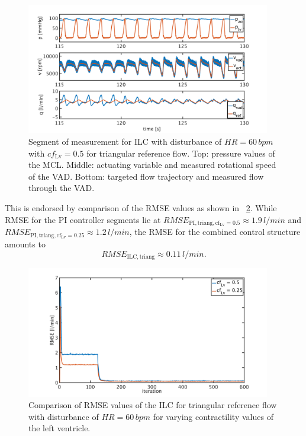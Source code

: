 \begin{figure}[ht!]
  \centering
  \includegraphics[width=0.95\textwidth]{images/chapt_5/ILC/pi_to_ilc_dist_triang_cf50.pdf}
  \caption[]{Segment of measurement for ILC with disturbance of $HR=60\,bpm$ with $cf_{\mathrm{Lv}}=0.5$ for triangular reference flow. Top:  pressure values of the MCL. Middle: actuating variable and measured rotational speed of the VAD. Bottom: targeted flow trajectory and measured flow through the VAD.}
  \label{fig:pi_to_ilc_dist_triang_cf50}
\end{figure}
This is endorsed by comparison of the RMSE values as shown in \figurename~\ref{fig:RMSE_dist_triang_var_cf}. While RMSE for the PI controller segments lie at $RMSE_{\mathrm{PI,triang,cf_{\mathrm{Lv}}=0.5}}\approx 1.9\, l/min$ and $RMSE_{\mathrm{PI,triang,cf_{\mathrm{Lv}}=0.25}}\approx 1.2\, l/min$, the RMSE for the combined control structure amounts to
\begin{equation}
  RMSE_{\mathrm{ILC,triang}}\approx 0.11\, l/min.
\end{equation}
\begin{figure}[ht!]
  \centering
  \includegraphics[width=0.95\textwidth]{images/chapt_5/ILC/RMSE_dist_triang_var_cf.pdf}
  \caption[RMSE Comparison of ILC at triangular reference flow for varying left ventricular contractilities]{Comparison of RMSE values of the ILC for triangular reference flow with disturbance of $HR=60\,bpm$ for varying contractility values of the left ventricle.}
  \label{fig:RMSE_dist_triang_var_cf}
\end{figure}

